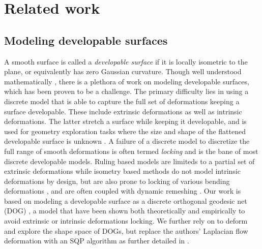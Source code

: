 \section{Related work}
\subsection{Modeling developable surfaces}
A smooth surface is called a \textit{developable surface} if it is locally isometric to the plane, or equivalently has zero Gaussian curvature. Though well understood mathematically \cite{do_carmo,spivak,computational_line}, there is a plethora of work on modeling developable surfaces, which has been proven to be a challenge. The primary difficulty lies in using a discrete model that is able to capture the full set of deformations keeping a surface developable. These include extrinsic deformations as well as intrinsic deformations. The latter stretch a surface while keeping it developable, and is used for geometry exploration tasks where the size and shape of the flattened developable surface is unknown \cite{conical,pottmann_new,rabi2018shape}. A failure of a discrete model to discretize the full range of smooth deformations is often termed \textit{locking} \cite{solomon,locking1} and is the bane of most discrete developable models. Ruling based models \cite{conical,curved_folding_kilian,pottmann_new,stein_dev,solomon} are limiteds to a partial set of extrinsic deformations while isometry based methods \cite{grin_shells,shells, goldenthal2007efficient,froh_botsch} do not model intrinsic deformations by design, but are also prone to locking of various bending deformations \cite{locking1,locking2}, and are often coupled with dynamic remeshing \cite{narain2012adaptive,StringActuated:2017,Narain,SchreckEG2017}.  Our work is based on modeling a developable surface as a discrete orthogonal geodesic net (DOG) \cite{rabi18}, a model that have been shown both theoretically and empirically to avoid extrinsic or intrinsic deformations locking. We further rely on \cite{rabi2018shape} to deform and explore the shape space of DOGs, but replace the authors' Laplacian flow deformation with an SQP algorithm as further detailed in .
